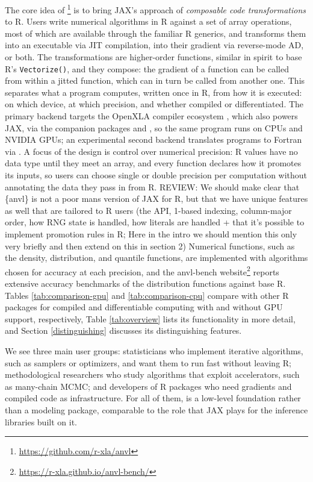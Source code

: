 The core idea of \footnote{\url{https://github.com/r-xla/anvl}} is to bring JAX's approach of \emph{composable code transformations} to R.
Users write numerical algorithms in R against a set of array operations, most of which are available through the familiar R generics, and  transforms them into an executable via JIT compilation, into their gradient via reverse-mode AD, or both.
The transformations are higher-order functions, similar in spirit to base R's \texttt{Vectorize()}, and they compose: the gradient of a function can be called from within a jitted function, which can in turn be called from another one.
This separates what a program computes, written once in R, from how it is executed: on which device, at which precision, and whether compiled or differentiated.
The primary backend targets the OpenXLA compiler ecosystem \citep{ref-openxla}, which also powers JAX, via the companion packages  and , so the same program runs on CPUs and NVIDIA GPUs; an experimental second backend translates programs to Fortran via  \citep{ref-quickr}.
A focus of the design is control over numerical precision: R values have no data type until they meet an array, and every function declares how it promotes its inputs, so users can choose single or double precision per computation without annotating the data they pass in from R.
REVIEW: We should make clear that \{anvl\} is not a poor mans version of JAX for R, but that we have unique features as well that are tailored to R users (the API, 1-based indexing, column-major order, how RNG state is handled, how literals are handled + that it's possible to implement promotion rules in R; Here in the intro we should mention this only very briefly and then extend on this in section 2)
Numerical functions, such as the density, distribution, and quantile functions, are implemented with algorithms chosen for accuracy at each precision, and the anvl-bench website\footnote{\url{https://r-xla.github.io/anvl-bench/}} reports extensive accuracy benchmarks of the distribution functions against base R.
Tables \ref{tab:comparison-gpu} and \ref{tab:comparison-cpu} compare  with other R packages for compiled and differentiable computing with and without GPU support, respectively, Table \ref{tab:overview} lists its functionality in more detail, and Section \ref{distinguishing} discusses its distinguishing features.

We see three main user groups: statisticians who implement iterative algorithms, such as samplers or optimizers, and want them to run fast without leaving R; methodological researchers who study algorithms that exploit accelerators, such as many-chain MCMC; and developers of R packages who need gradients and compiled code as infrastructure.
For all of them,  is a low-level foundation rather than a modeling package, comparable to the role that JAX plays for the inference libraries built on it.

